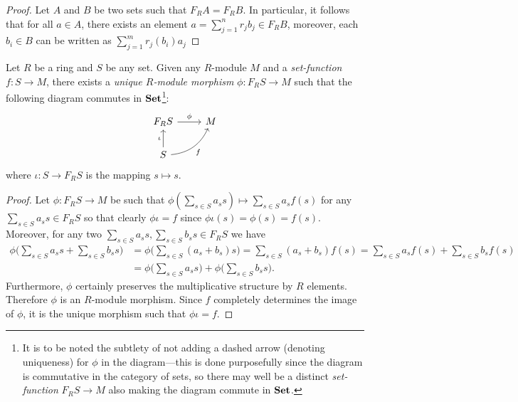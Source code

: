 \begin{proof}
Let \(A\) and \(B\) be two sets such that \(F_R A = F_R B\). In particular, it
follows that for all \(a \in A\), there exists an element \(a = \sum_{j=1}^n r_j
b_j \in F_R B\), moreover, each \(b_i \in B\) can be written as \(\sum_{j=1}^m
r_j(b_i) a_j\)
\end{proof}

\begin{proposition}
\label{prop:free-mod-univ-prop}
Let \(R\) be a ring and \(S\) be any set. Given any \(R\)-module \(M\) and a
\emph{set-function} \(f: S \to M\), there exists a \emph{unique \(R\)-module
  morphism} \(\phi: F_R S \to M\) such that the following diagram commutes in
\({\textbf{Set}}\)\footnote{It is to be noted the subtlety of not adding a dashed arrow
  (denoting uniqueness) for \(\phi\) in the diagram---this is done purposefully
  since the diagram is commutative in the category of sets, so there may well be
  a distinct \emph{set-function} \(F_R S \to M\) also making the diagram commute
  in \({\textbf{Set}}\).}:
\[
\begin{tikzcd}
F_R S \ar[r, "\phi"] &M \\
S \ar[u, "\iota"] \ar[ru, "f"', bend right] &
\end{tikzcd}
\]
where \(\iota: S \to F_R S\) is the mapping \(s \mapsto s\).
\end{proposition}

\begin{proof}
Let \(\phi: F_R S \to M\) be such that
\(\phi(\sum_{s \in S} a_s s) \mapsto \sum_{s \in S} a_s f(s)\) for any
\(\sum_{s \in S} a_s s \in F_R S\) so that clearly \(\phi \iota = f\) since
\(\phi \iota(s) = \phi(s) = f(s)\). Moreover, for any two
\(\sum_{s \in S} a_s s, \sum_{s \in S} b_s s \in F_R S\) we have
\begin{align*}
\phi\bigg( \sum_{s \in S} a_s s + \sum_{s \in S} b_s s \bigg)
&= \phi\bigg( \sum_{s \in S} (a_s + b_s) s \bigg)
= \sum_{s \in S} (a_s + b_s) f(s)
= \sum_{s \in S} a_s f(s) + \sum_{s \in S} b_s f(s) \\
&= \phi\bigg( \sum_{s \in S} a_s s \bigg)
+ \phi\bigg( \sum_{s \in S} b_s s \bigg).
\end{align*}
Furthermore, \(\phi\) certainly preserves the multiplicative structure by \(R\)
elements. Therefore \(\phi\) is an \(R\)-module morphism. Since \(f\) completely
determines the image of \(\phi\), it is the unique morphism such that
\(\phi \iota = f\).
\end{proof}

